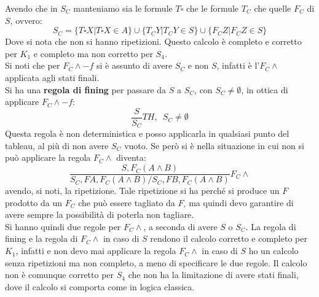 \documentclass[a4paper,12pt, oneside]{book}
\begin{document}
Avendo che in $S_C$ manteniamo sia le formule $T\square$ che le formule $T_C$
che quelle $F_C$ di $S$, ovvero:
\[S_C=\{T\square X|T\square X\in A\}\cup\{T_CY|T_CY\in S\}
  \cup\{F_CZ|F_CZ\in S\}\] 
Dove si nota che non si hanno ripetizioni. Questo calcolo è completo e corretto
per $K_1$ e completo ma non corretto per $S_4$.\\
Si noti che per $F_C\land -f$ si è assunto di avere $S_C$ e non $S$, infatti è
l'$F_C\land$ applicata agli stati finali.\\
Si ha una \textbf{regola di fining} per passare da $S$ a $S_C$, con $S_C\neq
\emptyset$, in ottica di applicare $F_C\land -f$:
\[\frac{S}{S_C}TH,\,\,\,S_C\neq \emptyset\]
Questa regola è non
deterministica e posso applicarla in qualsiasi punto del tableau, al più di non
avere $S_C$ vuoto. Se però si è
nella situazione in cui non si può applicare la regola $F_C\land$ diventa:
\[\frac{S,F_C(A\land B)}{S_C,FA,F_C(A\land B)/S_C,FB,F_C(A\land B)}F_C\land\]
avendo, si noti, la ripetizione. Tale ripetizione si ha perché si produce un $F$
prodotto da un $F_C$ che può essere tagliato da $F_\square$ ma quindi devo
garantire di avere sempre la possibilità di poterla non tagliare.\\
Si hanno quindi due regole per $F_C\land$, a
seconda di avere $S$ o $S_C$. La regola di fining e la regola di $F_C\land$ in
caso di $S$ rendono il calcolo corretto e completo per $K_1$, infatti e non devo
mai applicare la regola $F_C\land$ in caso di $S$ ho un calcolo senza
ripetizioni ma non completo, a meno di specificare le due regole. Il calcolo non
è comunque corretto per $S_4$ che non ha la limitazione di avere stati finali,
dove il calcolo si comporta come in logica classica.
\newpage
\end{document}
